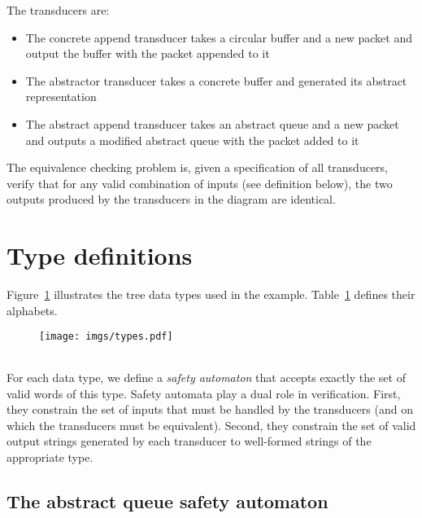 \documentclass{article}
\begin{document}
The transducers are:
\begin{itemize}
    \item The concrete append transducer takes a circular buffer 
        and a new packet and output the buffer with the packet 
        appended to it
    \item The abstractor transducer takes a concrete buffer and 
        generated its abstract representation
    \item The abstract append transducer takes an abstract queue 
        and a new packet and outputs a modified abstract queue 
        with the packet added to it
\end{itemize}

The equivalence checking problem is, given a specification of all 
transducers, verify that for any valid combination of inputs (see 
definition below), the two outputs produced by the transducers in 
the diagram are identical.

\section{Type definitions}

Figure~\ref{f:types} illustrates the tree data types used in the 
example.  Table~\ref{t:alphabet} defines their alphabets.  

\begin{figure}[t]
    \center
    \texttt{[image: imgs/types.pdf]}
    \caption{}\label{f:types}
\end{figure}

\begin{table}
    \begin{tabular}{|l|p{0.7\linewidth}|}
    \end{tabular}
    \label{t:alphabet}
\end{table}

For each data type, we define a \emph{safety automaton} that 
accepts exactly the set of valid words of this type.  Safety 
automata play a dual role in verification.  First, they constrain 
the set of inputs that must be handled by the transducers (and on 
which the transducers must be equivalent).  Second, they constrain 
the set of valid output strings generated by each transducer to 
well-formed strings of the appropriate type.

\subsection{The abstract queue safety automaton}
\end{document}
